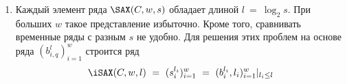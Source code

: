 \documentclass{.local/lib/classes/ndvr-super-article-standalone}
\begin{document}
\begin{enumerate}
        в свою бинарную форму.
        Из полученных форм строится ряд
        $B^{s}~=~(b^{s}_{i})^{w}_{i=1}$, 
        такой ряд обозначают\\
        $\SAX(C, w, s)~=~B^{s}$.
    \item 
        Каждый элемент ряда $\SAX(C, w, s)$
        обладает длиной $l~=~\log_{2}{s}$. 
        При больших $w$ такое представление избыточно. 
        Кроме того, сравнивать временные ряды 
        с разным $s$ не удобно.
        Для решения этих проблем на основе
        ряда $(b^{l}_{i,q})^{w}_{i=1}$
        строится ряд \[
            \iSAX(C, w, l) 
               ~=~(s^{l_i}_{i})^{w}_{i=1}                     
                   ~=~(b^{l_i}_{i}, l_i)^{w}_{i=1}|_{l_i \le l}
\]
\end{enumerate}
\end{document}

